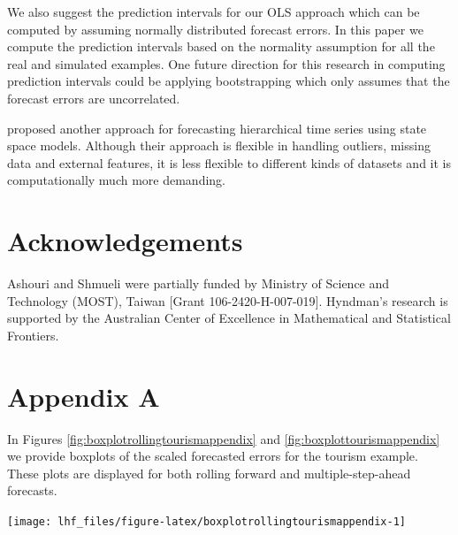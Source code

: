 \documentclass[11pt,a4paper,]{article}
\let\origfigure\figure
\let\endorigfigure\endfigure
\renewenvironment{figure}[1][2] {
    \expandafter\origfigure\expandafter[!htbp]
} {
    \endorigfigure
}
\begin{document}
We also suggest the prediction intervals for our OLS approach which can be computed by assuming normally distributed forecast errors. In this paper we compute the prediction intervals based on the normality assumption for all the real and simulated examples. One future direction for this research in computing prediction intervals could be applying bootstrapping which only assumes that the forecast errors are uncorrelated.

\textcite{pennings2017} proposed another approach for forecasting hierarchical time series using state space models. Although their approach is flexible in handling outliers, missing data and external features, it is less flexible to different kinds of datasets and it is computationally much more demanding.

\hypertarget{acknowledgements}{%
\section*{Acknowledgements}\label{acknowledgements}}

Ashouri and Shmueli were partially funded by Ministry of Science and Technology (MOST), Taiwan {[}Grant 106-2420-H-007-019{]}. Hyndman's research is supported by the Australian Center of Excellence in Mathematical and Statistical Frontiers.

\clearpage

\hypertarget{appendix-appendix}{%
\appendix}


\hypertarget{appendix-a}{%
\section{Appendix A}\label{appendix-a}}

In Figures \ref{fig:boxplotrollingtourismappendix} and \ref{fig:boxplottourismappendix} we provide boxplots of the scaled forecasted errors for the tourism example. These plots are displayed for both rolling forward and multiple-step-ahead forecasts.

\begin{figure}

{\centering \texttt{[image: lhf\_files/figure-latex/boxplotrollingtourismappendix-1]} 

}

\caption{Box plots of scaled forecast errors from reconciled and unreconciled ETS, ARIMA and OLS methods at each hierarchical level for rolling origin tourism demand.}\label{fig:boxplotrollingtourismappendix}
\end{figure}
\end{document}
